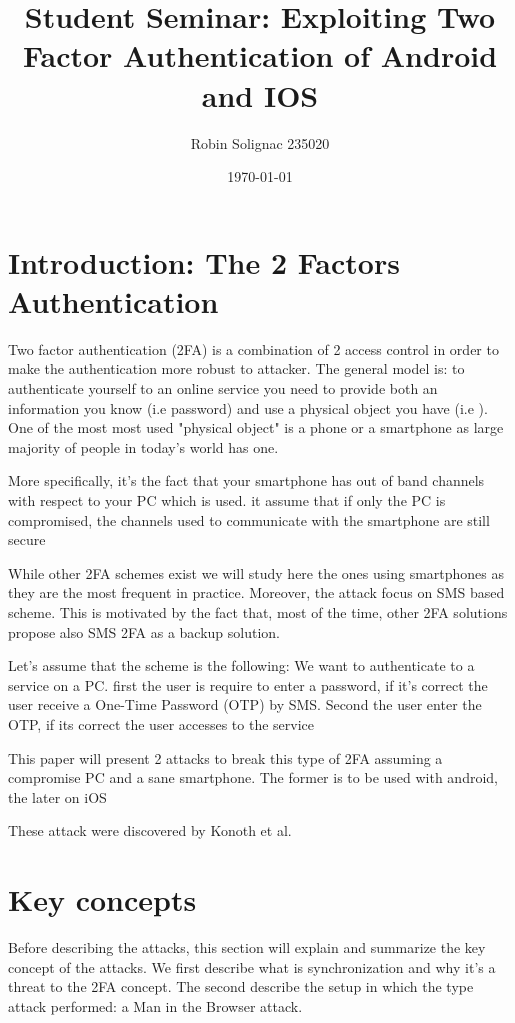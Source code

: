 \documentclass[11pt, a4paper,twocolumn]{article}
\title{Student Seminar: Exploiting Two Factor Authentication of Android and IOS}
\author{Robin Solignac 235020}
\date{\today}
\begin{document}
\maketitle

\section{Introduction: The 2 Factors Authentication}

Two factor authentication (2FA) is a combination of 2 access control  in order to make the authentication more robust to attacker. The general model is: to authenticate yourself to an online service you need to provide both an information you know (i.e password) and use a physical object you have (i.e \cite{wiki:secure}). 
One of the most most used "physical object" is a phone or a smartphone as large majority of people in today's world has one.

More specifically, it's the fact that your smartphone has out of band channels with respect to your PC which is used. it assume that if only the PC is compromised, the channels used to communicate with the smartphone are still secure

While other 2FA schemes exist \cite{wiki:secure,wiki:card} we will study here the ones using smartphones as they are the most frequent in practice. Moreover, the attack focus on SMS based scheme.
This is motivated by the fact that, most of the time, other 2FA solutions  propose also SMS 2FA as a backup solution.

Let's assume that the scheme is the following: We want to authenticate to a service on a PC. first the user is require to enter a password, if it's correct the user receive a One-Time Password (OTP) by SMS. Second the user enter the OTP, if its correct the user accesses to the service

This paper will present 2 attacks to break this type of 2FA assuming a compromise PC and a sane smartphone. The former is to be used with android, the later on iOS

These attack were discovered by Konoth et al. \cite{Base}

\section{Key concepts}
Before describing the attacks, this section will explain and summarize the key concept of the attacks. We first describe what is synchronization and why it's a threat to the 2FA concept. The second describe the setup in which the type attack performed: a Man in the Browser attack.
\end{document}
